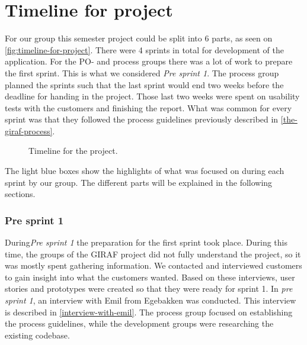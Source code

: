 \section{Timeline for project}
For our group this semester project could be split into 6 parts, as seen on \autoref{fig:timeline-for-project}.
There were 4 sprints in total for development of the application. 
For the PO- and process groups there was a lot of work to prepare the first sprint.
This is what we considered \textit{Pre sprint 1}.
The process group planned the sprints such that the last sprint would end two weeks before the deadline for handing in the project.
Those last two weeks were spent on usability tests with the customers and finishing the report.
What was common for every sprint was that they followed the process guidelines previously described in \autoref{the-giraf-process}.

\begin{figure}[H]
    \caption{\label{fig:timeline-for-project} Timeline for the project.}
\end{figure}

\noindent The light blue boxes show the highlights of what was focused on during each sprint by our group.
The different parts will be explained in the following sections.

\subsubsection{Pre sprint 1}
During\textit{Pre sprint 1} the preparation for the first sprint took place.
During this time, the groups of the GIRAF project did not fully understand the project, so it was mostly spent gathering information.
We contacted and interviewed customers to gain insight into what the customers wanted.
Based on these interviews, user stories and prototypes were created so that they were ready for sprint 1.
In \textit{pre sprint 1}, an interview with Emil from Egebakken was conducted. 
This interview is described in \autoref{interview-with-emil}.
The process group focused on establishing the process guidelines, while the development groups were researching the existing codebase.

